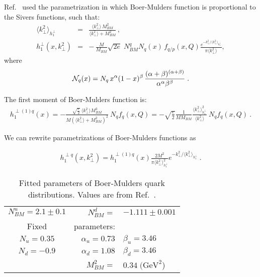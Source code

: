 \documentclass[a4paper,11pt]{article}
\newcommand{\ba}{\begin{eqnarray}}
\newcommand{\ea}{\end{eqnarray}}
\newcommand{\la}{\langle}
\newcommand{\ra}{\rangle}
\def\kperp{k_\perp}
\def\avkperp{\la \kperp^2 \ra}
\begin{document}
Ref.~\cite{Barone:2010gk} used the parametrization in which Boer-Mulders function is proportional to the Sivers functions, such that:
\ba
\avkperp_{h_1^\perp} &=& \frac{\avkperp \, M^2_{BM}}{\avkperp + M^2_{BM}} \, , \\
h_{1}^{\perp}(x, \kperp^2) &= &
- \,\frac{M}{M_{BM}}  
\sqrt{2e}\; N_{BM}^q N_q (x)
\, f_{q/p} (x, Q)\frac{e^{-\kperp^2/\avkperp_{h_{1}^{\perp}}}}{\pi\avkperp},  
\label{BM-dist}
\ea
 where  
%
\ba
{\cal N}_q(x)= N_q \, x^{\alpha} (1-x)^{\beta} \,
\frac{(\alpha + \beta)^{(\alpha +\beta)}}
{\alpha^{\alpha} \beta^{\beta}}\; .
 \ea

The first moment of Boer-Mulders function is:
\ba
h_{1}^{\perp (1) q}(x)  = -\frac{\sqrt{\frac{e}{2}} \ \avkperp M_{BM}^3}{M (\avkperp + M_{BM}^2)^2}  \ {N}_q f_q(x, Q) = -\sqrt{\frac{e}{2}} \frac{1}{M M_{BM}}  \frac{\avkperp_{h_1^\perp}^2}{\avkperp}    \ {N}_q  f_q(x, Q)
\label{bm} \ .
\ea
 
We can rewrite parametrizations of Boer-Mulders functions as

\ba
h_{1}^{\perp q}(x,\kperp^2) =  h_{1}^{\perp (1) q}(x)   \frac{2 M^2}{\pi \avkperp_{h_{1}^\perp}^2} e^{-\kperp^2/{\avkperp_{h_{1}^\perp}}}\label{bm_new} \ .
\ea
 
 \begin{table}
\centering
\begin{tabular}{crl}
\hline
$N_{BM}^u=2.1\pm0.1$ & $N_{BM}^d=$&$-1.111\pm0.001$   \\
Fixed & parameters: &  \\
$N_u=0.35$ & $\alpha_u=0.73$ & $\beta_u=3.46$ \\
$N_d=-0.9$ & $\alpha_d=1.08$ & $\beta_d=3.46$\\
& $M_{BM}^2=$&$0.34\; \textrm{(GeV}^2$)    \\
\hline
\end{tabular}
\caption{Fitted parameters of Boer-Mulders quark distributions. Values are from Ref.~\cite{Barone:2009hw}.}
\label{fitparbm}
\end{table}
%
 
\end{document}
